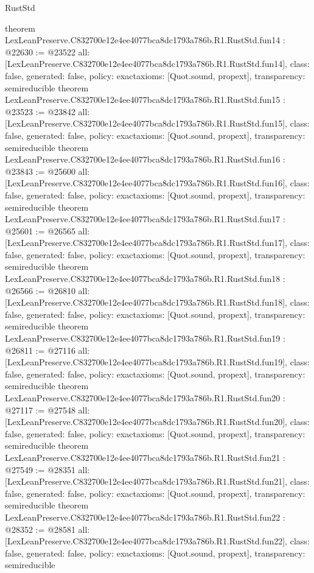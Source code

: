 \begin{lexlean}{RustStd}
\begin{coremodule}
{}
theorem LexLeanPreserve.C832700e12e4ee4077bca8dc1793a786b.R1.RustStd.fun14 : @22630 := @23522 {
  all: [LexLeanPreserve.C832700e12e4ee4077bca8dc1793a786b.R1.RustStd.fun14],
  class: false,
  generated: false,
  policy: exact{axioms: [Quot.sound, propext]},
  transparency: semireducible
}
theorem LexLeanPreserve.C832700e12e4ee4077bca8dc1793a786b.R1.RustStd.fun15 : @23523 := @23842 {
  all: [LexLeanPreserve.C832700e12e4ee4077bca8dc1793a786b.R1.RustStd.fun15],
  class: false,
  generated: false,
  policy: exact{axioms: [Quot.sound, propext]},
  transparency: semireducible
}
theorem LexLeanPreserve.C832700e12e4ee4077bca8dc1793a786b.R1.RustStd.fun16 : @23843 := @25600 {
  all: [LexLeanPreserve.C832700e12e4ee4077bca8dc1793a786b.R1.RustStd.fun16],
  class: false,
  generated: false,
  policy: exact{axioms: [Quot.sound, propext]},
  transparency: semireducible
}
theorem LexLeanPreserve.C832700e12e4ee4077bca8dc1793a786b.R1.RustStd.fun17 : @25601 := @26565 {
  all: [LexLeanPreserve.C832700e12e4ee4077bca8dc1793a786b.R1.RustStd.fun17],
  class: false,
  generated: false,
  policy: exact{axioms: [Quot.sound, propext]},
  transparency: semireducible
}
theorem LexLeanPreserve.C832700e12e4ee4077bca8dc1793a786b.R1.RustStd.fun18 : @26566 := @26810 {
  all: [LexLeanPreserve.C832700e12e4ee4077bca8dc1793a786b.R1.RustStd.fun18],
  class: false,
  generated: false,
  policy: exact{axioms: [Quot.sound, propext]},
  transparency: semireducible
}
theorem LexLeanPreserve.C832700e12e4ee4077bca8dc1793a786b.R1.RustStd.fun19 : @26811 := @27116 {
  all: [LexLeanPreserve.C832700e12e4ee4077bca8dc1793a786b.R1.RustStd.fun19],
  class: false,
  generated: false,
  policy: exact{axioms: [Quot.sound, propext]},
  transparency: semireducible
}
theorem LexLeanPreserve.C832700e12e4ee4077bca8dc1793a786b.R1.RustStd.fun20 : @27117 := @27548 {
  all: [LexLeanPreserve.C832700e12e4ee4077bca8dc1793a786b.R1.RustStd.fun20],
  class: false,
  generated: false,
  policy: exact{axioms: [Quot.sound, propext]},
  transparency: semireducible
}
theorem LexLeanPreserve.C832700e12e4ee4077bca8dc1793a786b.R1.RustStd.fun21 : @27549 := @28351 {
  all: [LexLeanPreserve.C832700e12e4ee4077bca8dc1793a786b.R1.RustStd.fun21],
  class: false,
  generated: false,
  policy: exact{axioms: [Quot.sound, propext]},
  transparency: semireducible
}
theorem LexLeanPreserve.C832700e12e4ee4077bca8dc1793a786b.R1.RustStd.fun22 : @28352 := @28581 {
  all: [LexLeanPreserve.C832700e12e4ee4077bca8dc1793a786b.R1.RustStd.fun22],
  class: false,
  generated: false,
  policy: exact{axioms: [Quot.sound, propext]},
  transparency: semireducible
}
\end{coremodule}
\end{lexlean}
